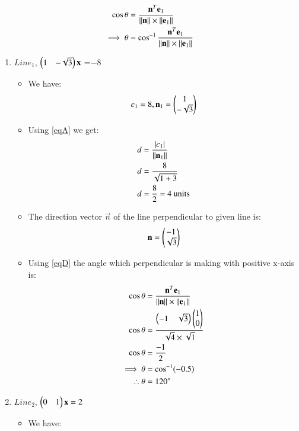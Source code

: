 \documentclass[journal,12pt,twocolumn]{IEEEtran}
\begin{document}
\begin{enumerate}
\begin{itemize}
\begin{align}
\cos \theta&=\frac{\mathbf{n}^T\mathbf{e\textsubscript{1}}}{\lVert\mathbf{n}\rVert\times\lVert\mathbf{e\textsubscript{1}}\rVert}
  \\
 \implies \theta &= \cos^{-1}\frac{\mathbf{n}^T\mathbf{e\textsubscript{1}}}{\lVert\mathbf{n}\rVert\times\lVert\mathbf{e\textsubscript{1}}\rVert}\label{eqD}
\end{align}
\end{itemize}
\begin{enumerate}[label=\alph*.]
\item $Line_1$, $\begin{pmatrix}1&-\sqrt{3}\end{pmatrix}\mathbf{x}$ =$-8$
\begin{itemize}
\item We have:
\begin{align}
 c\textsubscript{1}=8 , {\mathbf{n\textsubscript{1}}}=\begin{pmatrix}1\\-\sqrt{3}\end{pmatrix}  
\end{align}
\item Using \eqref{eqA} we get:
\begin{align}
d&=\frac { \left| c\textsubscript{1} \right| }{\lVert\mathbf{n\textsubscript{1}}\rVert}
\\
d&=\frac{8}{\sqrt{1+3}} 
\\
d&=\frac{8}{2}=4\text{ units}
\end{align}
\item The direction vector $\vec{n}$ of the line perpendicular to given line is: 
\begin{align}
    \mathbf{n}=\begin{pmatrix}-1\\\sqrt{3}\end{pmatrix}
\end{align}
\item Using \eqref{eqD} the angle which perpendicular is making with positive x-axis is:
\begin{align}
   \cos\theta &= \frac{\mathbf{n}^T\mathbf{e\textsubscript{1}}}{\lVert\mathbf{n}\rVert\times\lVert\mathbf{e\textsubscript{1}}\rVert}
   \\
   \cos\theta&= \frac{\begin{pmatrix}-1&\sqrt{3}\end{pmatrix}\begin{pmatrix}1\\0\end{pmatrix}}{\sqrt{4}\times\sqrt{1}}
     \\
 \cos\theta &= \frac{-1}{2}
 \\
 \implies \theta&=\cos^{-1}(-0.5)
 \\
 \therefore  \theta&=120\degree
\end{align}
\end{itemize}
\item $Line_2$, $\begin{pmatrix}0&1\end{pmatrix}\mathbf{x} =2$
\begin{itemize}
\item We have:

\end{itemize}
\end{enumerate}
\end{enumerate}
\end{document}
